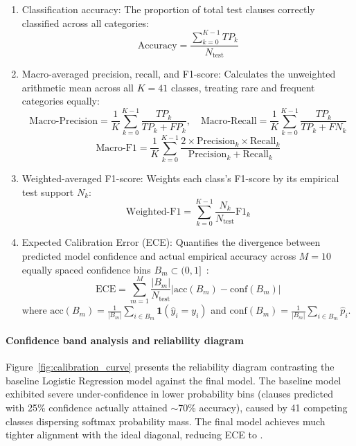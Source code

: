 \begin{enumerate}
    \item Classification accuracy: The proportion of total test clauses correctly classified across all categories:
    \begin{equation}
        \text{Accuracy} = \frac{\sum_{k=0}^{K-1} TP_k}{N_{\text{test}}}
        \label{eq:accuracy}
    \end{equation}
    
    \item Macro-averaged precision, recall, and F1-score: Calculates the unweighted arithmetic mean across all $K = 41$ classes, treating rare and frequent categories equally:
    \begin{equation}
        \text{Macro-Precision} = \frac{1}{K} \sum_{k=0}^{K-1} \frac{TP_k}{TP_k + FP_k}, \quad
        \text{Macro-Recall} = \frac{1}{K} \sum_{k=0}^{K-1} \frac{TP_k}{TP_k + FN_k}
        \label{eq:macro_pr}
    \end{equation}
    \begin{equation}
        \text{Macro-F1} = \frac{1}{K} \sum_{k=0}^{K-1} \frac{2 \times \text{Precision}_k \times \text{Recall}_k}{\text{Precision}_k + \text{Recall}_k}
        \label{eq:macro_f1}
    \end{equation}

    \item Weighted-averaged F1-score: Weights each class's F1-score by its empirical test support $N_k$:
    \begin{equation}
        \text{Weighted-F1} = \sum_{k=0}^{K-1} \frac{N_k}{N_{\text{test}}} \text{F1}_k
        \label{eq:weighted_f1}
    \end{equation}

    \item Expected Calibration Error (ECE): Quantifies the divergence between predicted model confidence and actual empirical accuracy across $M = 10$ equally spaced confidence bins $B_m \subset (0, 1]$~\cite{guo2017calibration}:
    \begin{equation}
        \text{ECE} = \sum_{m=1}^{M} \frac{|B_m|}{N_{\text{test}}} \big|\text{acc}(B_m) - \text{conf}(B_m)\big|
        \label{eq:ece}
    \end{equation}
    where $\text{acc}(B_m) = \frac{1}{|B_m|} \sum_{i \in B_m} \mathbf{1}(\hat{y}_i = y_i)$ and $\text{conf}(B_m) = \frac{1}{|B_m|} \sum_{i \in B_m} \hat{p}_i$.
\end{enumerate}

\paragraph*{Confidence band analysis and reliability diagram}
Figure~\ref{fig:calibration_curve} presents the reliability diagram contrasting the baseline Logistic Regression model against the final model. The baseline model exhibited severe under-confidence in lower probability bins (clauses predicted with 25\% confidence actually attained $\sim$70\% accuracy), caused by 41 competing classes dispersing softmax probability mass. The final model achieves much tighter alignment with the ideal diagonal, reducing ECE to \FinalSplitAECE{}.

